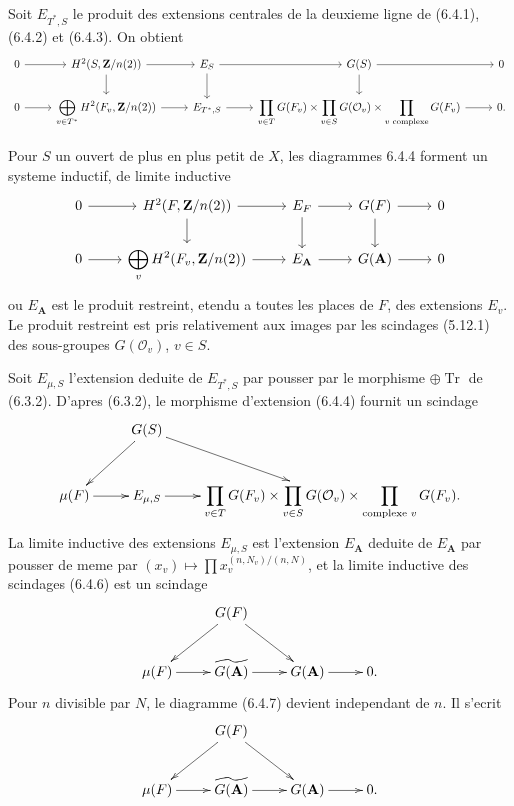 \documentclass[11pt,a4paper]{article}
\theoremstyle{plain}
\theoremstyle{definition}
\DeclareMathOperator{\Tr}{Tr}
\begin{document}
Soit $E_{T^*,S}$ le produit des extensions centrales de la deuxieme ligne de (6.4.1), (6.4.2) et (6.4.3). On obtient
\begin{equation}\label{6.4.4}
\begin{tikzcd}
0 \arrow{r} & H^2(S, \mathbf{Z}/n(2)) \arrow{r} \arrow{d} & E_S \arrow{r} \arrow{d} & G(S) \arrow{r} \arrow{d} & 0 \\
0 \arrow{r} & \displaystyle\bigoplus_{v \in T^*} H^2(F_v, \mathbf{Z}/n(2)) \arrow{r} & E_{T^*,S} \arrow{r} & \displaystyle\prod_{v \in T} G(F_v) \times \prod_{v \in S} G(\mathcal{O}_v) \times \prod_{v \text{ complexe}} G(F_v) \arrow{r} & 0.
\end{tikzcd}
\end{equation}

Pour $S$ un ouvert de plus en plus petit de $X$, les diagrammes 6.4.4 forment un systeme inductif, de limite inductive
\[
\begin{tikzcd}
0 \arrow{r} & H^2(F, \mathbf{Z}/n(2)) \arrow{r} \arrow{d} & E_F \arrow{r} \arrow{d} & G(F) \arrow{r} \arrow{d} & 0 \\
0 \arrow{r} & \displaystyle\bigoplus_v H^2(F_v, \mathbf{Z}/n(2)) \arrow{r} & E_{\mathbf{A}} \arrow{r} & G(\mathbf{A}) \arrow{r} & 0
\end{tikzcd}
\]
ou $E_{\mathbf{A}}$ est le produit restreint, etendu a toutes les places de $F$, des extensions $E_v$. Le produit restreint est pris relativement aux images par les scindages (5.12.1) des sous-groupes $G(\mathcal{O}_v)$, $v \in S$.

Soit $E_{\mu,S}$ l'extension deduite de $E_{T^*,S}$ par pousser par le morphisme $\oplus \Tr$ de (6.3.2). D'apres (6.3.2), le morphisme d'extension (6.4.4) fournit un scindage
\[
\xymatrix{
& G(S) \ar[dl] \ar[dr] & \\
\mu(F) \ar[r] & E_{\mu,S} \ar[r] & \displaystyle\prod_{v \in T} G(F_v) \times \prod_{v \in S} G(\mathcal{O}_v) \times \prod_{\text{complexe } v} G(F_v). }
\]
La limite inductive des extensions $E_{\mu,S}$ est l'extension $E_{\mathbf{A}}$ deduite de $E_{\mathbf{A}}$ par pousser de meme par $(x_v) \mapsto \prod x_v^{(n,N_v)/(n,N)}$, et la limite inductive des scindages (6.4.6) est un scindage
\[
\xymatrix{
& G(F) \ar[dl] \ar[dr] & \\
\mu(F) \ar[r] & \widetilde{G(\mathbf{A})} \ar[r] & G(\mathbf{A}) \ar[r] & 0. }
\]
Pour $n$ divisible par $N$, le diagramme (6.4.7) devient independant de $n$. Il s'ecrit
\begin{equation}\label{6.4.8}
\xymatrix{
& G(F) \ar[dl] \ar[dr] & \\
\mu(F) \ar[r] & \widetilde{G(\mathbf{A})} \ar[r] & G(\mathbf{A}) \ar[r] & 0. }
\end{equation}
\end{document}
